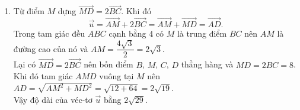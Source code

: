 \begin{bt}
{\begin{enumerate}
\begin{eqnarray*}
    &=& \dfrac{1}{4}\overrightarrow{AB} + \dfrac{1}{2}\overrightarrow{AC} + \dfrac{3}{4}\overrightarrow{AC} - \dfrac{3}{4}\overrightarrow{AB} = \dfrac{5}{4}\overrightarrow{AC} - \dfrac{1}{2}\overrightarrow{AB}.
   \end{eqnarray*}
   Vậy ta có điều phải chứng minh.
   \item \textrm{}
   \begin{center}
   \end{center}
   Từ điểm $M$ dựng $\overrightarrow{MD}=2\overrightarrow{BC}$. Khi đó
   $$\overrightarrow{u} = \overrightarrow{AM} + 2\overrightarrow{BC} = \overrightarrow{AM} + \overrightarrow{MD} = \overrightarrow{AD}.$$
   Trong tam giác đều $ABC$ cạnh bằng $4$ có $M$ là trung điểm $BC$ nên $AM$ là đường cao của nó và $AM = \dfrac{4\sqrt{3}}{2} = 2\sqrt{3}$.\\
   Lại có $\overrightarrow{MD} = 2\overrightarrow{BC}$ nên bốn điểm $B$, $M$, $C$, $D$ thẳng hàng và $MD=2BC=8$.\\
   Khi đó tam giác $AMD$ vuông tại $M$ nên $AD = \sqrt{AM^2+MD^2} = \sqrt{12+64} = 2\sqrt{19}$.\\
   Vậy độ dài của véc-tơ $\overrightarrow{u}$ bằng $2\sqrt{29}$.
  \end{enumerate}
  }
\end{bt}



